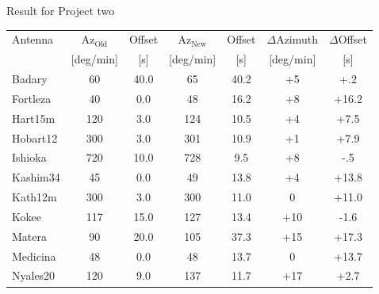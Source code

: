\documentclass{beamer}
\begin{document}
    \begin{frame}{Result for Project two}
        \tabcolsep=0.15cm
        \begin{tabular}{l | c c | c c |c c}
            Antenna & $\text{Az}_{\text{Old}}$ & Offset & $\text{Az}_{\text{New}}$ & Offset & $\Delta$Azimuth & $\Delta$Offset \\ [-8pt]
                    & \tiny{[deg/min]}& \tiny{[s]}&\tiny{[deg/min]}&\tiny{[s]}&\tiny{[deg/min]}& \tiny{[s]} \\ 
            \hline
            Badary            & 60  & 40.0  & 65  & 40.2 &  +5 &  +.2 \\
            Fortleza          & 40  &  0.0  & 48  & 16.2 &  +8 &+16.2 \\
            Hart15m           & 120 &  3.0  & 124 & 10.5 &  +4 & +7.5 \\
            Hobart12          & 300 &  3.0  & 301 & 10.9 &  +1 & +7.9 \\
            Ishioka           & 720 & 10.0  & 728 &  9.5 &  +8 &  -.5 \\
            Kashim34          & 45  &  0.0  & 49  & 13.8 &  +4 &+13.8 \\
            Kath12m           & 300 &  3.0  & 300 & 11.0 &   0 &+11.0 \\
            Kokee             & 117 & 15.0  & 127 & 13.4 & +10 & -1.6 \\
            Matera            & 90  & 20.0  & 105 & 37.3 & +15 &+17.3 \\
            Medicina          &  48 &  0.0  & 48  & 13.7 &   0 &+13.7 \\
            Nyales20          & 120 &  9.0  & 137 & 11.7 & +17 & +2.7 \\
        \end{tabular}
    \end{frame}
\end{document}
